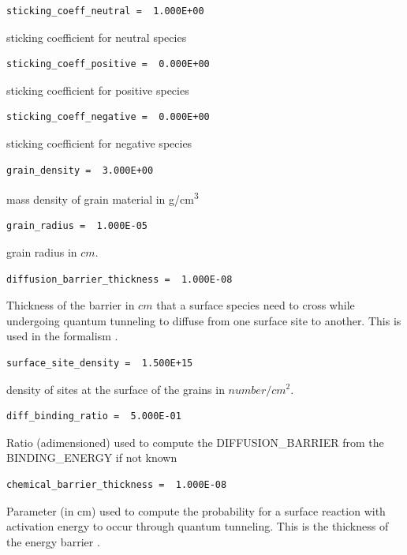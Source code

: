 \documentclass[english,a4paper,twoside]{article}
\begin{document}
\begin{verbatim}
sticking_coeff_neutral =  1.000E+00
\end{verbatim}
sticking coefficient for neutral species

\begin{verbatim}
sticking_coeff_positive =  0.000E+00
\end{verbatim}
sticking coefficient for positive species

\begin{verbatim}
sticking_coeff_negative =  0.000E+00
\end{verbatim}
sticking coefficient for negative species

\begin{verbatim}
grain_density =  3.000E+00
\end{verbatim}
mass density of grain material in \unit{g/cm^3}

\begin{verbatim}
grain_radius =  1.000E-05
\end{verbatim}
grain radius in $\unit{cm}$.

\begin{verbatim}
diffusion_barrier_thickness =  1.000E-08
\end{verbatim}
Thickness of the barrier in $\unit{cm}$ that a surface species need to cross while undergoing quantum tunneling to diffuse from one surface site to another. This is used in the formalism \citep[see equation 10 (parameter a)]{1992ApJS...82..167H}.

\begin{verbatim}
surface_site_density =  1.500E+15
\end{verbatim}
density of sites at the surface of the grains in $\unit{number/cm^{2}}$.

\begin{verbatim}
diff_binding_ratio =  5.000E-01
\end{verbatim}
Ratio (adimensioned) used to compute the DIFFUSION\_BARRIER from the BINDING\_ENERGY if not known

\begin{verbatim}
chemical_barrier_thickness =  1.000E-08
\end{verbatim}
Parameter (in cm) used to compute the probability for a surface reaction with activation energy to occur through quantum tunneling. This is the thickness of the energy barrier \citep[See equation 6]{1992ApJS...82..167H}.
\end{document}
